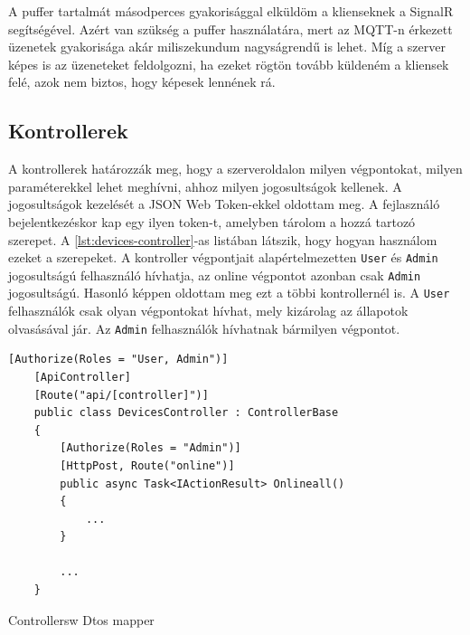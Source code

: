 A puffer tartalmát másodperces gyakorisággal elküldöm a klienseknek a SignalR segítségével. 
Azért van szükség a puffer használatára, mert az MQTT-n érkezett üzenetek gyakorisága akár miliszekundum nagyságrendű is lehet. 
Míg a szerver képes is az üzeneteket feldolgozni, ha ezeket rögtön tovább küldeném a kliensek felé, azok nem biztos, hogy képesek lennének rá.

\subsection{Kontrollerek}
A kontrollerek határozzák meg, hogy a szerveroldalon milyen végpontokat, milyen paraméterekkel lehet meghívni, ahhoz milyen jogosultságok kellenek.
A jogosultságok kezelését a JSON Web Token-ekkel oldottam meg. A fejlasználó bejelentkezéskor kap egy ilyen token-t, 
amelyben tárolom a hozzá tartozó szerepet. A \ref{lst:devices-controller}-as listában látszik, hogy hogyan használom ezeket a szerepeket.
A kontroller végpontjait alapértelmezetten \verb+User+ és \verb+Admin+ jogosultságú felhasználó hívhatja, az online végpontot azonban csak \verb+Admin+ jogosultságú.
Hasonló képpen oldottam meg ezt a többi kontrollernél is. A \verb+User+ felhasználók csak olyan végpontokat hívhat, mely kizárolag az állapotok olvasásával jár.
Az \verb+Admin+ felhasználók hívhatnak bármilyen végpontot.

\begin{lstlisting}[caption=Az eszköz kontroller és annak "online" végpontja, label=lst:devices-controller]
    [Authorize(Roles = "User, Admin")]
    [ApiController]
    [Route("api/[controller]")]
    public class DevicesController : ControllerBase
    {
        [Authorize(Roles = "Admin")]
        [HttpPost, Route("online")]
        public async Task<IActionResult> Onlineall()
        {
            ...
        }

        ...
    }
\end{lstlisting}

Controllersw
Dtos
mapper